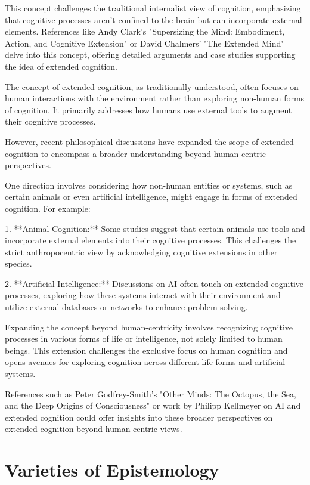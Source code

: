 \documentclass[10pt,titlepage]{book}
\begin{document}
This concept challenges the traditional internalist view of cognition, emphasizing that cognitive processes aren't confined to the brain but can incorporate external elements. References like Andy Clark's "Supersizing the Mind: Embodiment, Action, and Cognitive Extension" or David Chalmers' "The Extended Mind" delve into this concept, offering detailed arguments and case studies supporting the idea of extended cognition.

The concept of extended cognition, as traditionally understood, often focuses on human interactions with the environment rather than exploring non-human forms of cognition. It primarily addresses how humans use external tools to augment their cognitive processes.

However, recent philosophical discussions have expanded the scope of extended cognition to encompass a broader understanding beyond human-centric perspectives. 

One direction involves considering how non-human entities or systems, such as certain animals or even artificial intelligence, might engage in forms of extended cognition. For example:

1. **Animal Cognition:** Some studies suggest that certain animals use tools and incorporate external elements into their cognitive processes. This challenges the strict anthropocentric view by acknowledging cognitive extensions in other species.

2. **Artificial Intelligence:** Discussions on AI often touch on extended cognitive processes, exploring how these systems interact with their environment and utilize external databases or networks to enhance problem-solving.

Expanding the concept beyond human-centricity involves recognizing cognitive processes in various forms of life or intelligence, not solely limited to human beings. This extension challenges the exclusive focus on human cognition and opens avenues for exploring cognition across different life forms and artificial systems.

References such as Peter Godfrey-Smith's "Other Minds: The Octopus, the Sea, and the Deep Origins of Consciousness" or work by Philipp Kellmeyer on AI and extended cognition could offer insights into these broader perspectives on extended cognition beyond human-centric views.


\chapter{Varieties of Epistemology}
\end{document}
